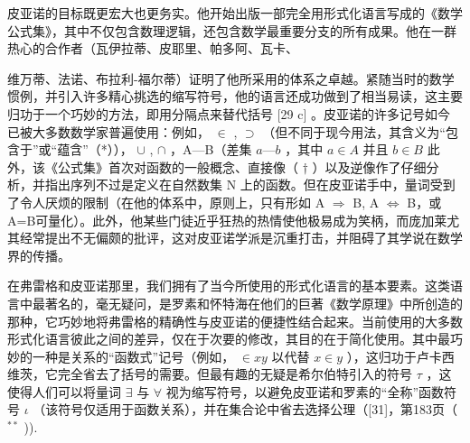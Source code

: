 皮亚诺的目标既更宏大也更务实。他开始出版一部完全用形式化语言写成的《数学公式集》，其中不仅包含数理逻辑，还包含数学最重要分支的所有成果。他在一群热心的合作者（瓦伊拉蒂、皮耶里、帕多阿、瓦卡、

维万蒂、法诺、布拉利-福尔蒂）证明了他所采用的体系之卓越。紧随当时的数学惯例，并引入许多精心挑选的缩写符号，他的语言还成功做到了相当易读，这主要归功于一个巧妙的方法，即用分隔点来替代括号 {[}29 c{]} 。皮亚诺的许多记号如今已被大多数数学家普遍使用：例如， \(\in\) , \(\supset\) （但不同于现今用法，其含义为“包含于”或“蕴含”（*））， \(\cup\) , \(\cap\) ，A---B（差集 \(a—b\) ，其中 \(a\in A\) 并且 \(b\in B\) 此外，该《公式集》首次对函数的一般概念、直接像（ \(\dagger\) ）以及逆像作了仔细分析，并指出序列不过是定义在自然数集 N 上的函数。但在皮亚诺手中，量词受到了令人厌烦的限制（在他的体系中，原则上，只有形如 A \(\Longrightarrow\) B, A \(\Longleftrightarrow\) B，或A=B可量化）。此外，他某些门徒近乎狂热的热情使他极易成为笑柄，而庞加莱尤其经常提出不无偏颇的批评，这对皮亚诺学派是沉重打击，并阻碍了其学说在数学界的传播。

在弗雷格和皮亚诺那里，我们拥有了当今所使用的形式化语言的基本要素。这类语言中最著名的，毫无疑问，是罗素和怀特海在他们的巨著《数学原理》中所创造的那种，它巧妙地将弗雷格的精确性与皮亚诺的便捷性结合起来。当前使用的大多数形式化语言彼此之间的差异，仅在于次要的修改，其目的在于简化使用。其中最巧妙的一种是关系的“函数式”记号（例如， \(\in xy\) 以代替 \(x \in y\) ），这归功于卢卡西维茨，它完全省去了括号的需要。但最有趣的无疑是希尔伯特引入的符号 \(\tau\) ，这使得人们可以将量词 \(\exists\) 与 \(\forall\) 视为缩写符号，以避免皮亚诺和罗素的“全称”函数符号 \(\iota\) （该符号仅适用于函数关系），并在集合论中省去选择公理（{[}31{]}，第183页（ \(^{**}\) )).

